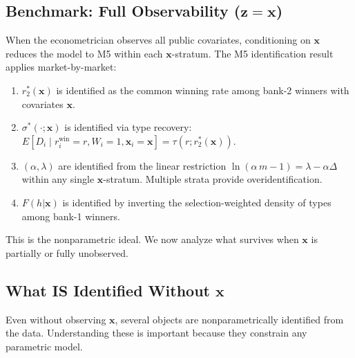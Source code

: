 \documentclass[12pt]{article}
\theoremstyle{plain}
\theoremstyle{plain}
\theoremstyle{definition}  %
\theoremstyle{remark}  %
\begin{document}
\subsection{Benchmark: Full Observability ($\mathbf{z} = \mathbf{x}$)}\label{sec:benchmark}

When the econometrician observes all public covariates, conditioning on $\mathbf{x}$ reduces the model to M5 within each $\mathbf{x}$-stratum. The M5 identification result applies market-by-market:

\begin{enumerate}
    \item $r_2^*(\mathbf{x})$ is identified as the common winning rate among bank-2 winners with covariates $\mathbf{x}$.
    \item $\sigma^*(\cdot; \mathbf{x})$ is identified via type recovery: $E[D_i \mid r_i^{\text{win}} = r, W_i = 1, \mathbf{x}_i = \mathbf{x}] = \tau(r; r_2^*(\mathbf{x}))$.
    \item $(\alpha, \lambda)$ are identified from the linear restriction $\ln(\alpha\,m -1) = \lambda - \alpha\Delta$ within any single $\mathbf{x}$-stratum.  Multiple strata provide overidentification.
    \item $F(h|\mathbf{x})$ is identified by inverting the selection-weighted density of types among bank-1 winners.
\end{enumerate}

\noindent This is the nonparametric ideal. We now analyze what survives when $\mathbf{x}$ is partially or fully unobserved.


\subsection{What IS Identified Without $\mathbf{x}$}\label{sec:what_is}

Even without observing $\mathbf{x}$, several objects are nonparametrically identified from the data. Understanding these is important because they constrain any parametric model.
\end{document}
